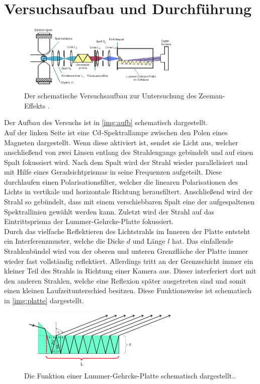 \section{Versuchsaufbau und Durchführung}
\label{sec:durch}

\begin{figure}[H]
    \centering
    \includegraphics[width=0.7\textwidth]{latex/images/Aufbau.PNG}
    \caption{Der schematische Versuchsaufbau zur Untersuchung des Zeeman-Effekts \protect \cite{V27}.}
    \label{img:aufb}
\end{figure}
Der Aufbau des Versuchs ist in \autoref{img:aufb} schematisch dargestellt.\\
Auf der linken Seite ist eine $\ce{Cd}$-Spektrallampe zwischen den Polen eines Magneten dargestellt. 
Wenn diese aktiviert ist,  sendet sie Licht aus, welcher anschließend von zwei Linsen entlang des Strahlengangs gebündelt und auf einen Spalt fokussiert wird.
Nach dem Spalt wird der Strahl wieder parallelisiert und mit Hilfe eines Geradsichtprismas in seine Frequenzen aufgeteilt.
Diese durchlaufen einen Polarisationsfilter, welcher die linearen Polarisationen des Lichts in vertikale und horizontale Richtung herausfiltert.
Anschließend wird der Strahl so gebündelt, dass mit einem verschiebbaren Spalt eine der aufgespaltenen Spektrallinien gewählt werden kann. 
Zuletzt wird der Strahl auf das Eintrittsprisma der Lummer-Gehrcke-Platte fokussiert.\\
Durch das vielfache Reflektieren des Lichtstrahls im Inneren der Platte entsteht ein Interferenzmuster, welche die Dicke $d$ und Länge $l$ hat. 
Das einfallende Strahlenbündel wird von der oberen und unteren Grenzfläche der Platte immer wieder fast vollständig reflektiert.
Allerdings tritt an der Grenzschicht immer ein kleiner Teil des Strahls in Richtung einer Kamera aus. 
Dieser interferiert dort mit den anderen Strahlen, welche eine Reflexion später ausgetreten sind und somit einen kleinen Laufzeitunterschied besitzen.
Diese Funktionsweise ist schematisch in \autoref{img:platte} dargestellt.
\begin{figure}[h]
    \centering
    \includegraphics[width=0.7\textwidth]{latex/images/Platte.PNG}
    \caption{Die Funktion einer Lummer-Gehrcke-Platte schematisch dargestellt.\protect \cite{V27}.}
    \label{img:platte}
\end{figure}

